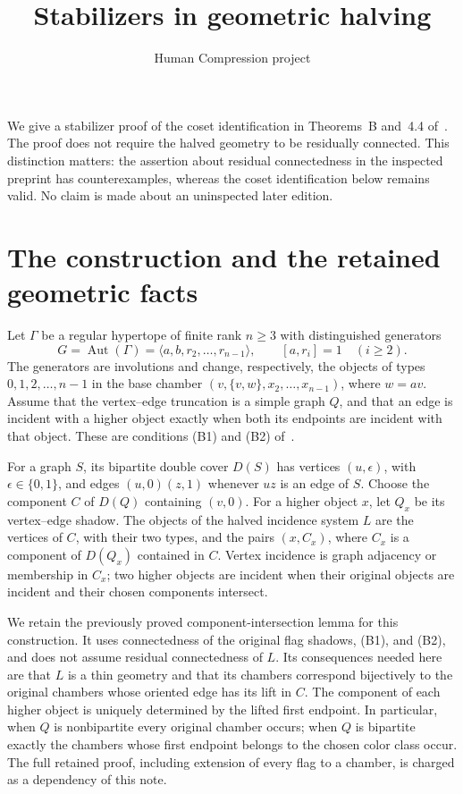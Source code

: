 \documentclass[11pt,a4paper]{article}
\title{Stabilizers in geometric halving}
\author{Human Compression project}
\date{}
\newcommand{\gen}[1]{\langle #1\rangle}
\newcommand{\Aut}{\operatorname{Aut}}
\begin{document}
\maketitle

We give a stabilizer proof of the coset identification in
Theorems~B and~4.4 of~\cite{PT}. The proof does not
require the halved geometry to be residually connected. This distinction
matters: the assertion about residual connectedness in the inspected preprint
has counterexamples, whereas the coset identification below remains
valid. No claim is made about an uninspected later edition.

\section{The construction and the retained geometric facts}
Let $\Gamma$ be a regular hypertope of finite rank $n\ge3$ with
distinguished generators
\[
 G=\Aut(\Gamma)=\gen{a,b,r_2,\ldots,r_{n-1}},
 \qquad [a,r_i]=1\quad(i\ge2).
\]
The generators are involutions and change, respectively, the objects
of types $0,1,2,\ldots,n-1$ in the base chamber
$(v,\{v,w\},x_2,\ldots,x_{n-1})$, where $w=av$.
Assume that the vertex--edge truncation is a simple graph $Q$, and
that an edge is incident with a higher object exactly when both its
endpoints are incident with that object. These are conditions
(B1) and (B2) of~\cite{PT}.

For a graph $S$, its bipartite double cover $D(S)$ has vertices
$(u,\epsilon)$, with $\epsilon\in\{0,1\}$, and edges
$(u,0)(z,1)$ whenever $uz$ is an edge of $S$.
Choose the component $C$ of $D(Q)$ containing $(v,0)$.
For a higher object $x$, let $Q_x$ be its vertex--edge shadow.
The objects of the halved incidence system $L$ are the vertices
of $C$, with their two types, and the pairs $(x,C_x)$, where $C_x$
is a component of $D(Q_x)$ contained in $C$.
Vertex incidence is graph adjacency or membership in $C_x$;
two higher objects are incident when their original objects are
incident and their chosen components intersect.

We retain the previously proved component-intersection lemma for
this construction. It uses connectedness of the original flag
shadows, (B1), and (B2), and does not assume residual connectedness
of $L$. Its consequences needed here are that $L$ is a thin geometry
and that its chambers correspond bijectively to the original
chambers whose oriented edge has its lift in $C$. The component
of each higher object is uniquely determined by the lifted first
endpoint. In particular, when $Q$ is nonbipartite every original
chamber occurs; when $Q$ is bipartite exactly the chambers whose
first endpoint belongs to the chosen color class occur.
The full retained proof, including extension of every flag to a
chamber, is charged as a dependency of this note.
\end{document}
